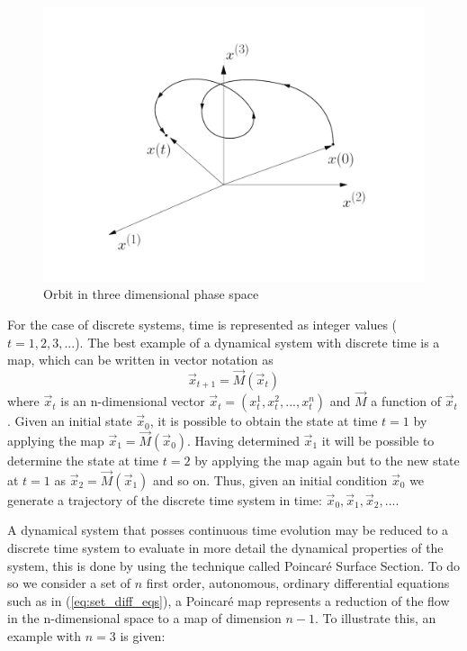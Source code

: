 \begin{figure}[H]
\centering
\includegraphics[width=1.\textwidth]{Figures/orbit_3d.pdf}
\caption{Orbit in three dimensional phase space}
\label{fig:3d_orbit_ps}
\end{figure}

For the case of discrete systems, time is represented as integer values ($t=1,2,3,...$). The best example of a dynamical system with discrete time is a map, which can be written in vector notation as
\begin{equation}

\vec{x}_{t+1}=\vec{M}(\vec{x}_t)
\label{eq:discrete_dyn_sys}
\end{equation}
where $\vec{x}_t$ is an n-dimensional vector $\vec{x}_t=(x^{1}_t,x^{2}_t,...,x^{n}_t)$ and $\vec{M}$ a function of $\vec{x}_t$. Given an initial state $\vec{x}_0$, it is possible to obtain the state at time $t=1$ by applying the map $\vec{x}_{1}=\vec{M}(\vec{x}_0)$. Having determined $\vec{x}_1$ it will be possible to determine the state at time $t=2$ by applying the map again but to the new state at $t=1$ as $\vec{x}_2=\vec{M}(\vec{x}_1)$ and so on. Thus, given an initial condition $\vec{x}_0$ we generate a trajectory of the discrete time system in time: $\vec{x}_0,\vec{x}_1,\vec{x}_2,...$. 

A dynamical system that posses continuous time evolution may be reduced to a discrete time system to evaluate in more detail the dynamical properties of the system, this is done by using the technique called Poincaré Surface Section. To do so we consider a set of $n$ first order, autonomous, ordinary differential equations such as in  (\ref{eq:set_diff_eqs}), a Poincaré map represents a reduction of the flow in the n-dimensional space to a map of dimension $n-1$. To illustrate this, an example with $n=3$ is given:

